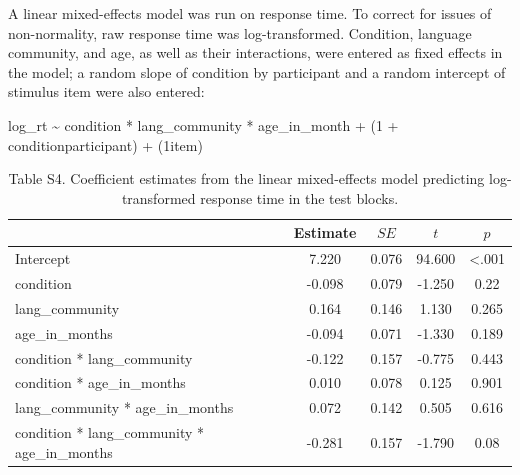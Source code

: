 \documentclass[
  man,floatsintext]{apa7}
\begin{document}
A linear mixed-effects model was run on response time. To correct for issues of non-normality, raw response time was log-transformed. Condition, language community, and age, as well as their interactions, were entered as fixed effects in the model; a random slope of condition by participant and a random intercept of stimulus item were also entered:

log\_rt \textasciitilde{} condition * lang\_community * age\_in\_month + (1 + condition\textbar participant) + (1\textbar item)

\begin{table}[H]

\begin{center}
\begin{threeparttable}

\caption{\label{tab:unnamed-chunk-14}Table S4. Coefficient estimates from the linear mixed-effects model predicting log-transformed response time in the test blocks.}

\begin{tabular}{lcccc}
\toprule
 & Estimate & $SE$ & $t$ & $p$\\
\midrule
Intercept & 7.220 & 0.076 & 94.600 & <.001\\
condition & -0.098 & 0.079 & -1.250 & 0.22\\
lang\_community & 0.164 & 0.146 & 1.130 & 0.265\\
age\_in\_months & -0.094 & 0.071 & -1.330 & 0.189\\
condition * lang\_community & -0.122 & 0.157 & -0.775 & 0.443\\
condition * age\_in\_months & 0.010 & 0.078 & 0.125 & 0.901\\
lang\_community * age\_in\_months & 0.072 & 0.142 & 0.505 & 0.616\\
condition * lang\_community * age\_in\_months & -0.281 & 0.157 & -1.790 & 0.08\\
\bottomrule
\end{tabular}

\end{threeparttable}
\end{center}

\end{table}
\end{document}

